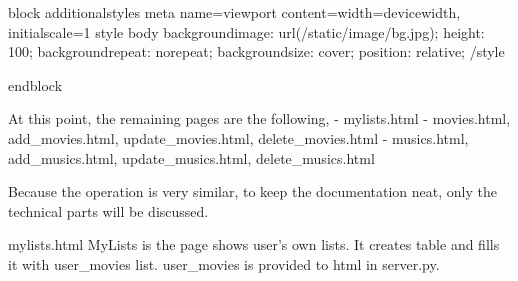 \documentclass[letterpaper,10pt,english]{sphinxmanual}
\begin{document}
\begin{sphinxVerbatim}[commandchars=\\\{\}]
\PYGZob{}\PYGZpc{} block additional\PYGZus{}styles \PYGZpc{}\PYGZcb{}
    \PYGZlt{}meta name=\PYGZdq{}viewport\PYGZdq{} content=\PYGZdq{}width=device\PYGZhy{}width, initial\PYGZhy{}scale=1\PYGZdq{}\PYGZgt{}
    \PYGZlt{}style\PYGZgt{}
       body \PYGZob{}
            background\PYGZhy{}image: url(\PYGZsq{}/static/image/bg.jpg\PYGZsq{});
            height: 100\PYGZpc{};
            background\PYGZhy{}repeat: no\PYGZhy{}repeat;
            background\PYGZhy{}size: cover;
            position: relative;
       \PYGZcb{}
    \PYGZlt{}/style\PYGZgt{}

\PYGZob{}\PYGZpc{} endblock \PYGZpc{}\PYGZcb{}
\end{sphinxVerbatim}

At this point, the remaining pages are the following,
-  mylists.html
-  movies.html, add\_movies.html, update\_movies.html, delete\_movies.html
-  musics.html, add\_musics.html, update\_musics.html, delete\_musics.html

Because the operation is very similar, to keep the documentation neat, only the technical parts will be
discussed.

 mylists.html
MyLists is the page shows user’s own lists. It creates table and fills it with user\_movies list.
user\_movies is provided to html in server.py.
\end{document}
